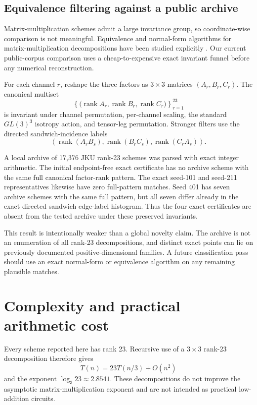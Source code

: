 \documentclass[11pt]{article}
\newcommand{\rank}{\operatorname{rank}}
\begin{document}
\subsection{Equivalence filtering against a public archive}

Matrix-multiplication schemes admit a large invariance group, so coordinate-wise comparison is not meaningful.  Equivalence and normal-form algorithms for matrix-multiplication decompositions have been studied explicitly \cite{berger2022,kauers2022}.  Our current public-corpus comparison uses a cheap-to-expensive exact invariant funnel before any numerical reconstruction.

For each channel $r$, reshape the three factors as $3\times3$ matrices $(A_r,B_r,C_r)$.  The canonical multiset
\begin{equation}
\left\{\bigl(\rank A_r,\rank B_r,\rank C_r\bigr)\right\}_{r=1}^{23}
\end{equation}
is invariant under channel permutation, per-channel scaling, the standard $GL(3)^3$ isotropy action, and tensor-leg permutation.  Stronger filters use the directed sandwich-incidence labels
\begin{equation}
\left(
\rank(A_rB_s),
\rank(B_rC_s),
\rank(C_rA_s)
\right).
\end{equation}

A local archive of 17,376 JKU rank-23 schemes was parsed with exact integer arithmetic.  The initial endpoint-free exact certificate has no archive scheme with the same full canonical factor-rank pattern.  The exact seed-101 and seed-211 representatives likewise have zero full-pattern matches.  Seed 401 has seven archive schemes with the same full pattern, but all seven differ already in the exact directed sandwich edge-label histogram.  Thus the four exact certificates are absent from the tested archive under these preserved invariants.

This result is intentionally weaker than a global novelty claim.  The archive is not an enumeration of all rank-23 decompositions, and distinct exact points can lie on previously documented positive-dimensional families.  A future classification pass should use an exact normal-form or equivalence algorithm on any remaining plausible matches.

\section{Complexity and practical arithmetic cost}

Every scheme reported here has rank 23.  Recursive use of a $3\times3$ rank-23 decomposition therefore gives
\begin{equation}
T(n)=23T(n/3)+O(n^2)
\end{equation}
and the exponent $\log_3 23\approx2.8541$.  These decompositions do not improve the asymptotic matrix-multiplication exponent and are not intended as practical low-addition circuits.
\end{document}
